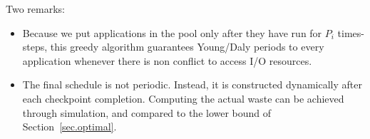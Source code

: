 \documentclass{article}
\begin{document}
Two remarks:
\begin{itemize}
\item Because we put applications in the pool only after they have run for $P_{i}$ times-steps,
this greedy algorithm guarantees Young/Daly periods to every application
whenever there is non conflict to access I/O resources.
\item The final schedule is not periodic. Instead, it is constructed dynamically
after each checkpoint completion. Computing the actual waste can be achieved 
through simulation, and compared to the lower bound of Section~\ref{sec.optimal}. 
\end{itemize}




\end{document}
